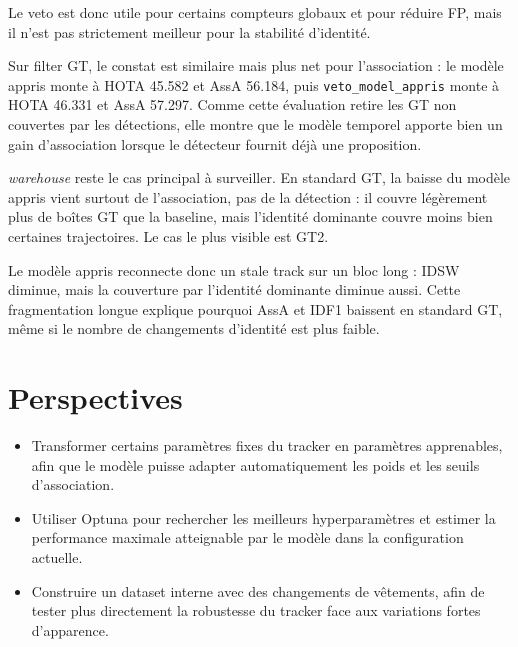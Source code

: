\documentclass[11pt,a4paper]{article}
\begin{document}
Le veto est donc utile pour certains compteurs globaux et pour réduire FP, mais il n'est pas strictement meilleur pour la stabilité d'identité.

Sur filter GT, le constat est similaire mais plus net pour l'association : le modèle appris monte à HOTA 45.582 et AssA 56.184, puis \texttt{veto\_model\_appris} monte à HOTA 46.331 et AssA 57.297. Comme cette évaluation retire les GT non couvertes par les détections, elle montre que le modèle temporel apporte bien un gain d'association lorsque le détecteur fournit déjà une proposition.

\textit{warehouse} reste le cas principal à surveiller. En standard GT, la baisse du modèle appris vient surtout de l'association, pas de la détection : il couvre légèrement plus de boîtes GT que la baseline, mais l'identité dominante couvre moins bien certaines trajectoires. Le cas le plus visible est GT2.

\begin{table}[H]
\centering
{}
\caption{Exemple de fragmentation longue sur \textit{warehouse}: couverture de GT2 par les tracker IDs.}
\end{table}

Le modèle appris reconnecte donc un stale track sur un bloc long : IDSW diminue, mais la couverture par l'identité dominante diminue aussi. Cette fragmentation longue explique pourquoi AssA et IDF1 baissent en standard GT, même si le nombre de changements d'identité est plus faible.

\section{Perspectives}

\begin{itemize}
    \item Transformer certains paramètres fixes du tracker en paramètres apprenables, afin que le modèle puisse adapter automatiquement les poids et les seuils d'association.
    \item Utiliser Optuna pour rechercher les meilleurs hyperparamètres et estimer la performance maximale atteignable par le modèle dans la configuration actuelle.
    \item Construire un dataset interne avec des changements de vêtements, afin de tester plus directement la robustesse du tracker face aux variations fortes d'apparence.
\end{itemize}
\end{document}
